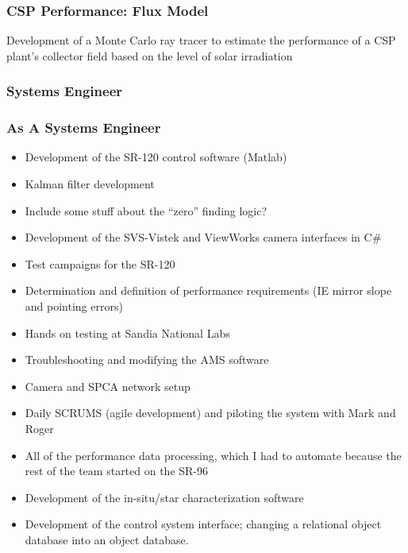 \documentclass[aspectratio=169]{beamer}
\begin{document}
\begin{frame}
  \frametitle{CSP Performance: Flux Model} Development of a Monte
  Carlo ray tracer to estimate the performance of a CSP plant's
  collector field based on the level of solar irradiation
\end{frame}

\subsubsection{Systems Engineer}
\begin{frame}
  \frametitle{As A Systems Engineer}
  \begin{itemize}
  \item Development of the SR-120 control software (Matlab)
  \item Kalman filter development
  \item Include some stuff about the ``zero'' finding logic?
  \item Development of the SVS-Vistek and ViewWorks camera interfaces
    in C\#
  \item Test campaigns for the SR-120
  \item Determination and definition of performance requirements (IE
    mirror slope and pointing errors)
  \item Hands on testing at Sandia National Labs
  \item Troubleshooting and modifying the AMS software
  \item Camera and SPCA network setup
  \item Daily SCRUMS (agile development) and piloting the system with
    Mark and Roger
  \item All of the performance data processing, which I had to
    automate because the rest of the team started on the SR-96
  \item Development of the in-situ/star characterization software
  \item Development of the control system interface; changing a
    relational object database into an object database.
  \end{itemize}
\end{frame}
\end{document}
